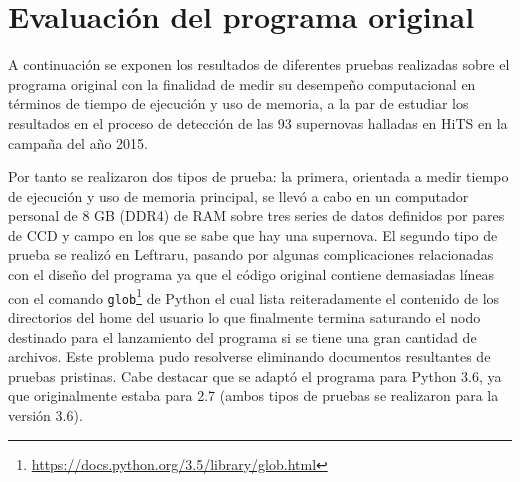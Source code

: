 \chapter{Evaluaci\'on del programa original}
\label{ch:prev_work}

A continuaci\'on se exponen los resultados de diferentes pruebas realizadas sobre el programa original con la finalidad de medir su desempe\~no computacional en t\'erminos de tiempo de ejecuci\'on y uso de memoria, a la par de estudiar los resultados en el proceso de detecci\'on de las 93 supernovas halladas en HiTS en la campa\~na del a\~no 2015.
\bigskip

Por tanto se realizaron dos tipos de prueba: la primera, orientada a medir tiempo de ejecuci\'on y uso de memoria principal, se llev\'o a cabo en un computador personal de 8 GB (DDR4) de RAM sobre tres series de datos definidos por pares de CCD y campo en los que se sabe que hay una supernova. El segundo tipo de prueba se realiz\'o en Leftraru, pasando por algunas complicaciones relacionadas con el dise\~no del programa ya que el c\'odigo original contiene demasiadas l\'ineas con el comando \texttt{glob}\footnote{\url{https://docs.python.org/3.5/library/glob.html}} de Python el cual lista reiteradamente el contenido de los directorios del home del usuario lo que finalmente termina saturando el nodo destinado para el lanzamiento del programa si se tiene una gran cantidad de archivos. Este problema pudo resolverse eliminando documentos resultantes de pruebas pristinas. Cabe destacar que se adapt\'o el programa para Python 3.6, ya que originalmente estaba para 2.7 (ambos tipos de pruebas se realizaron para la versi\'on 3.6). %
\bigskip

